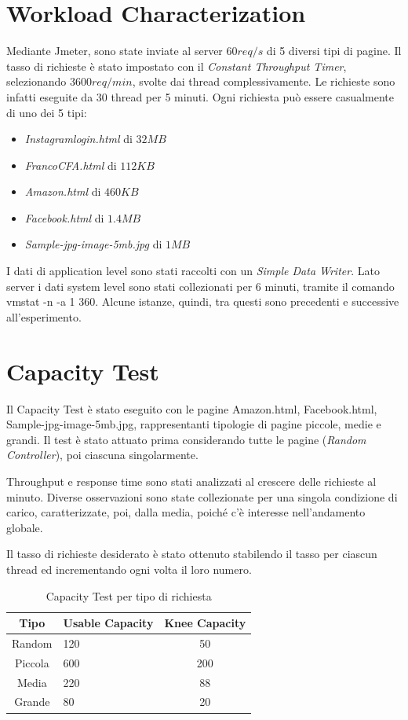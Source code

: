 	\section{Workload Characterization}
		Mediante Jmeter, sono state inviate al server $60req/s$ di 5 diversi tipi di pagine. Il tasso di richieste è stato impostato con il \emph{Constant Throughput Timer}, selezionando $3600req/min$, svolte dai thread complessivamente. Le richieste sono infatti eseguite da 30 thread per 5 minuti. Ogni richiesta può essere casualmente di uno dei 5 tipi:
		\begin{itemize}
			\item \emph{Instagramlogin.html} di $32MB$
			\item \emph{FrancoCFA.html} di $112KB$
			\item \emph{Amazon.html} di $460KB$
			\item \emph{Facebook.html} di $1.4MB$
			\item \emph{Sample-jpg-image-5mb.jpg} di $1MB$
		\end{itemize}
		
		I dati di application level sono stati raccolti con un \emph{Simple Data Writer}. Lato server i dati system level sono stati collezionati per 6 minuti, tramite il comando \textsf{vmstat -n -a 1 360}. Alcune istanze, quindi, tra questi sono precedenti e successive all'esperimento.
	\section{Capacity Test}
		Il Capacity Test è stato eseguito con le pagine Amazon.html, Facebook.html, Sample-jpg-image-5mb.jpg, rappresentanti tipologie di pagine piccole, medie e grandi. Il test è stato attuato prima considerando tutte le pagine (\emph{Random Controller}), poi ciascuna singolarmente.\par
		Throughput e response time sono stati analizzati al crescere delle richieste al minuto. Diverse osservazioni sono state collezionate per una singola condizione di carico, caratterizzate, poi, dalla media, poiché c'è interesse nell'andamento globale.\par
		Il tasso di richieste desiderato è stato ottenuto stabilendo il tasso per ciascun thread ed incrementando ogni volta il loro numero.
		
		\begin{table}
			\footnotesize
			\caption{Capacity Test per tipo di richiesta}
			\label{tab:ct-tip}
			\centering
			\begin{tabular}{cp{}c}
				\toprule
				\textbf{Tipo} &
				\textbf{Usable Capacity} &
				\textbf{Knee Capacity}\\
				\midrule
				Random &
				120 &
				50\\
				\midrule
				Piccola &
				600 &
				200\\
				\midrule
				Media &
				220 &
				88\\
				\midrule
				Grande &
				80 &
				20\\
				\bottomrule			
			\end{tabular}
		\end{table}
	
